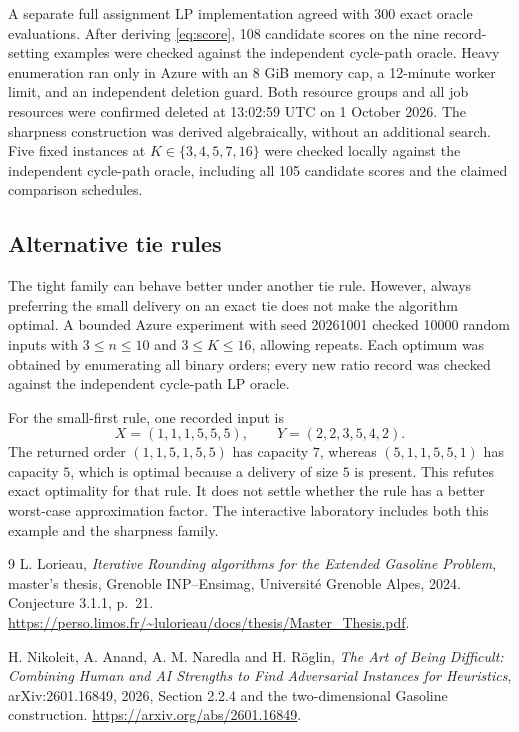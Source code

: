 \documentclass[11pt]{article}
\begin{document}
A separate full assignment LP implementation agreed with 300 exact oracle
evaluations. After deriving \eqref{eq:score}, 108 candidate scores on the nine
record-setting examples were checked against the independent cycle-path oracle.
Heavy enumeration ran only in Azure with an 8 GiB memory cap, a 12-minute
worker limit, and an independent deletion guard. Both resource groups and all
job resources were confirmed deleted at 13:02:59 UTC on 1 October 2026.
The sharpness construction was derived algebraically, without an additional
search. Five fixed instances at $K\in\{3,4,5,7,16\}$ were checked locally
against the independent cycle-path oracle, including all 105 candidate scores
and the claimed comparison schedules.


\subsection*{Alternative tie rules}
The tight family can behave better under another tie rule. However, always
preferring the small delivery on an exact tie does not make the algorithm
optimal. A bounded Azure experiment with seed 20261001 checked 10000 random
inputs with $3\le n\le10$ and $3\le K\le16$, allowing repeats. Each optimum
was obtained by enumerating all binary orders; every new ratio record was
checked against the independent cycle-path LP oracle.

For the small-first rule, one recorded input is
\[
X=(1,1,1,5,5,5),\qquad Y=(2,2,3,5,4,2).
\]
The returned order $(1,1,5,1,5,5)$ has capacity $7$, whereas
$(5,1,1,5,5,1)$ has capacity $5$, which is optimal because a delivery of size
$5$ is present. This refutes exact optimality for that rule. It does not
settle whether the rule has a better worst-case approximation factor.
The interactive laboratory includes both this example and the sharpness family.

\begin{thebibliography}{9}
L. Lorieau, \emph{Iterative Rounding algorithms for the Extended Gasoline
Problem}, master's thesis, Grenoble INP--Ensimag, Universit\'e Grenoble
Alpes, 2024. Conjecture 3.1.1, p.~21.
\url{https://perso.limos.fr/~lulorieau/docs/thesis/Master_Thesis.pdf}.

H. Nikoleit, A. Anand, A. M. Naredla and H. R\"oglin,
\emph{The Art of Being Difficult: Combining Human and AI Strengths to
Find Adversarial Instances for Heuristics}, arXiv:2601.16849, 2026,
Section 2.2.4 and the two-dimensional Gasoline construction.
\url{https://arxiv.org/abs/2601.16849}.
\end{thebibliography}
\end{document}
